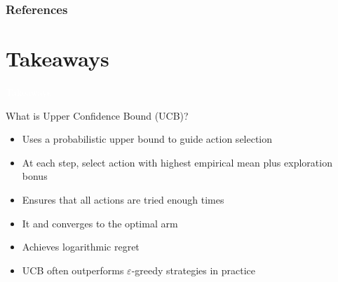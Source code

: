 \documentclass[11pt,table]{beamer}
\begin{document}
\begin{frame}[t,allowframebreaks
]%
\frametitle{References}
\small

\end{frame}



\section{Takeaways}
{
\begin{frame}
\centering
\Huge
\textcolor{white}{Takeaways}
\thispagestyle{empty}
\end{frame}
}

\begin{frame}{What is Upper Confidence Bound (UCB)?}
\begin{itemize}
    \item Uses a probabilistic upper bound to guide action selection
    \item At each step, select action with highest empirical mean plus exploration bonus
    \item Ensures that all actions are tried enough times
		\item It and converges to the optimal arm
    \item Achieves logarithmic regret
		\item UCB often outperforms $\varepsilon$-greedy strategies in practice
\end{itemize}
\end{frame}
\end{document}
